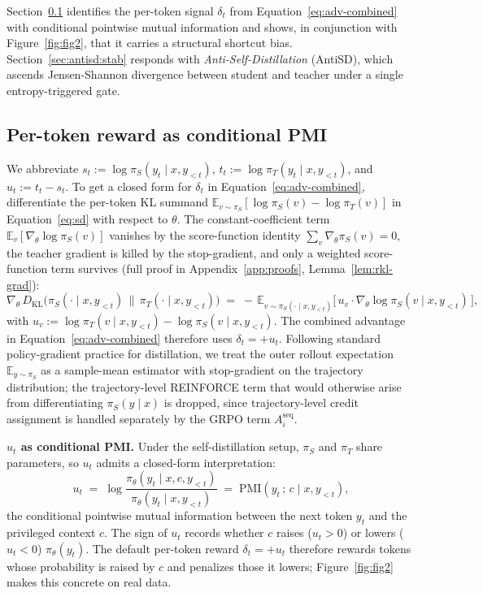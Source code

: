 \documentclass{article}
\begin{document}
Section~\ref{sec:antisd:direction} identifies the per-token signal $\delta_t$ from Equation~\eqref{eq:adv-combined} with conditional pointwise mutual information and shows, in conjunction with Figure~\ref{fig:fig2}, that it carries a structural shortcut bias. Section~\ref{sec:antisd:stab} responds with \emph{Anti-Self-Distillation} (AntiSD), which ascends Jensen-Shannon divergence between student and teacher under a single entropy-triggered gate.

\subsection{Per-token reward as conditional PMI}
\label{sec:antisd:direction}
\vspace{-0.5em}

We abbreviate $s_t := \log \pi_S(y_t \mid x, y_{<t})$, $t_t := \log \pi_T(y_t \mid x, y_{<t})$, and $u_t := t_t - s_t$. To get a closed form for $\delta_t$ in Equation~\eqref{eq:adv-combined}, differentiate the per-token KL summand $\mathbb{E}_{v \sim \pi_S}[\log \pi_S(v) - \log \pi_T(v)]$ in Equation~\eqref{eq:sd} with respect to $\theta$. The constant-coefficient term $\mathbb{E}_v[\nabla_\theta \log \pi_S(v)]$ vanishes by the score-function identity $\sum_v \nabla_\theta \pi_S(v) = 0$, the teacher gradient is killed by the stop-gradient, and only a weighted score-function term survives (full proof in Appendix~\ref{app:proofs}, Lemma~\ref{lem:rkl-grad}):
\begin{equation}
  \nabla_\theta\, D_{\mathrm{KL}}\!\big( \pi_S(\cdot \mid x, y_{<t}) \,\big\|\, \pi_T(\cdot \mid x, y_{<t}) \big)
  \;=\;
  - \,\mathbb{E}_{v \sim \pi_S(\cdot \mid x, y_{<t})}\!\Big[\, u_v \cdot \nabla_\theta \log \pi_S(v \mid x, y_{<t}) \,\Big],
  \label{eq:thm1-grad}
\end{equation}
with $u_v := \log \pi_T(v \mid x, y_{<t}) - \log \pi_S(v \mid x, y_{<t})$. The combined advantage in Equation~\eqref{eq:adv-combined} therefore uses $\delta_t = +u_t$. Following standard policy-gradient practice for distillation, we treat the outer rollout expectation $\mathbb{E}_{y \sim \pi_S}$ as a sample-mean estimator with stop-gradient on the trajectory distribution; the trajectory-level REINFORCE term that would otherwise arise from differentiating $\pi_S(y \mid x)$ is dropped, since trajectory-level credit assignment is handled separately by the GRPO term $A_i^{\mathrm{seq}}$.

\textbf{$u_t$ as conditional PMI.} Under the self-distillation setup, $\pi_S$ and $\pi_T$ share parameters, so $u_t$ admits a closed-form interpretation:
\begin{equation}
  u_t \;=\; \log \frac{\pi_\theta(y_t \mid x, c, y_{<t})}{\pi_\theta(y_t \mid x, y_{<t})} \;=\; \mathrm{PMI}(y_t\,;\, c \mid x, y_{<t}),
  \label{eq:pmi}
\end{equation}
the conditional pointwise mutual information between the next token $y_t$ and the privileged context $c$. The sign of $u_t$ records whether $c$ raises ($u_t > 0$) or lowers ($u_t < 0$) $\pi_\theta(y_t)$. The default per-token reward $\delta_t = +u_t$ therefore rewards tokens whose probability is raised by $c$ and penalizes those it lowers; Figure~\ref{fig:fig2} makes this concrete on real data.
\end{document}
